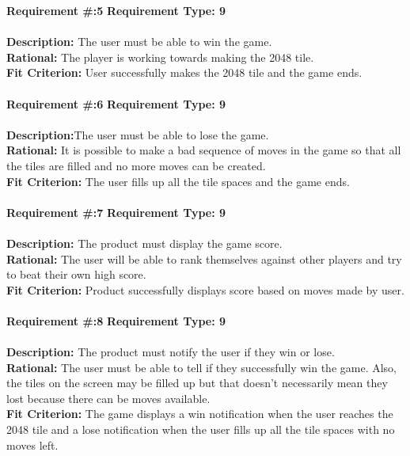 \documentclass[12pt]{article}
\begin{document}
\textbf {Requirement \#:5} \indent\textbf {Requirement Type: 9} \\\\
\textbf {Description:} The user must be able to win the game.\\
\textbf {Rational:} The player is working towards making the 2048 tile. \\
\textbf {Fit Criterion:} User successfully makes the 2048 tile and the game ends. \\\\

\textbf {Requirement \#:6} \indent\textbf {Requirement Type: 9}\\\\
\textbf {Description:}The user must be able to lose the game. \\
\textbf {Rational:} It is possible to make a bad sequence of moves in the game so that all the tiles are filled and no more moves can be created.\\
\textbf {Fit Criterion:} The user fills up all the tile spaces and the game ends.\\\\

\textbf {Requirement \#:7} \indent\textbf {Requirement Type: 9} \\\\
\textbf {Description:} The product must display the game score.\\
\textbf {Rational:} The user will be able to rank themselves against other players and try to beat their own high score.\\
\textbf {Fit Criterion:} Product successfully displays score based on moves made by user.\\\\

\textbf {Requirement \#:8} \indent\textbf {Requirement Type: 9} \\\\
\textbf {Description:} The product must notify the user if they win or lose.\\
\textbf {Rational:} The user must be able to tell if they successfully win the game. Also, the tiles on the screen may be filled up but that doesn't necessarily mean they lost because there can be moves available. \\
\textbf {Fit Criterion:} The game displays a win notification when the user reaches the 2048 tile and a lose notification when the user fills up all the tile spaces with no moves left. \\\\
\end{document}

